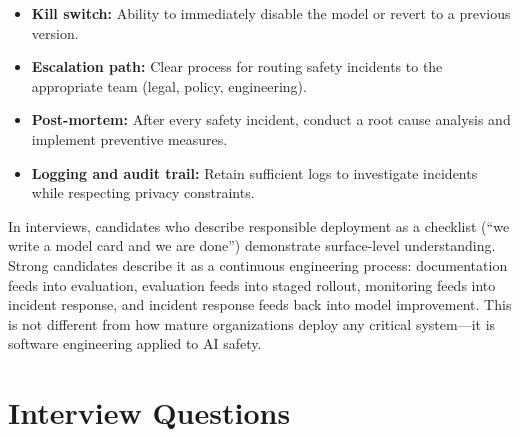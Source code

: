 \begin{itemize}
    \item \textbf{Kill switch:} Ability to immediately disable the model or
    revert to a previous version.
    \item \textbf{Escalation path:} Clear process for routing safety incidents
    to the appropriate team (legal, policy, engineering).
    \item \textbf{Post-mortem:} After every safety incident, conduct a root
    cause analysis and implement preventive measures.
    \item \textbf{Logging and audit trail:} Retain sufficient logs to
    investigate incidents while respecting privacy constraints.
\end{itemize}

\begin{keyinsight}
In interviews, candidates who describe responsible deployment as a checklist
(``we write a model card and we are done'') demonstrate surface-level
understanding.  Strong candidates describe it as a continuous engineering
process: documentation feeds into evaluation, evaluation feeds into staged
rollout, monitoring feeds into incident response, and incident response feeds
back into model improvement.  This is not different from how mature
organizations deploy any critical system---it is software engineering
applied to AI safety.
\end{keyinsight}

\section{Interview Questions}
\label{sec:safety_interview_questions}

